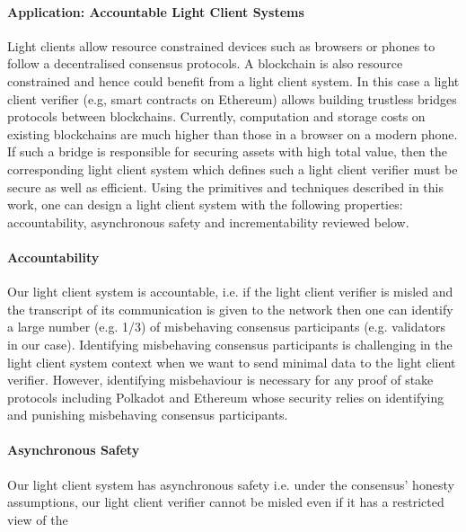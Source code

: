 \paragraph{Application: Accountable Light Client Systems} %
Light clients allow resource constrained devices such as browsers or phones to follow a decentralised consensus protocols. A blockchain is also resource constrained and hence could benefit from a light client system. In this case a light client verifier (e.g, smart contracts on 
Ethereum) allows building trustless bridges protocols between blockchains. %
Currently, computation and storage 
costs on existing blockchains are much higher than those in a browser on a modern phone. If such a bridge is responsible for securing assets with high total value, then the corresponding light client system which defines such a light client verifier must be secure as well as efficient. Using the primitives and techniques described in this work, one can design a light client system with the following properties: accountability, asynchronous safety and incrementability reviewed below.  \vspace{-0.2cm}
\noindent\paragraph{Accountability}Our light client system is accountable, i.e. if the light client verifier is misled and the transcript of its communication is given to the network then one can identify a large 
number (e.g. 1/3) of misbehaving consensus participants (e.g. validators in our case). Identifying misbehaving consensus participants 
is challenging in the light client system context when we want to send minimal data to the light client verifier. However, 
identifying misbehaviour is necessary for any proof of stake protocols including Polkadot and Ethereum whose security relies on identifying and punishing misbehaving consensus participants. 
\vspace{-0.2cm}
\noindent\paragraph{Asynchronous Safety}Our light client system has asynchronous safety i.e. under the consensus' honesty assumptions, our light client verifier cannot be misled even if it has a restricted view of the 
